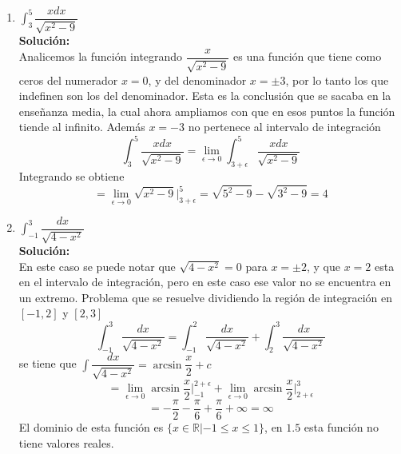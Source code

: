 \documentclass[10pt,twoside]{SelfArx} %
\begin{document}
\begin{enumerate}
\item $ \int_{3}^{5}\dfrac{xdx}{\sqrt{x^{2}-9}} $\\
\textbf{Solución:}\\
Analicemos la función integrando
$  \dfrac{x}{\sqrt{x^{2}-9}}  $ es una función que tiene como ceros del numerador $ x=0 $, y del denominador $ x=\pm3 $, por lo tanto los que indefinen son los del denominador. Esta es la conclusión que se sacaba en la enseñanza media, la cual ahora ampliamos con que en esos puntos la función tiende al infinito. Además $ x=-3 $ no pertenece al intervalo de integraci\'on
\begin{equation}
\int_{3}^{5}\dfrac{xdx}{\sqrt{x^{2}-9}}=\lim\limits_{\epsilon\rightarrow0}\int_{3+\epsilon}^{5}\dfrac{xdx}{\sqrt{x^{2}-9}}
\end{equation}
Integrando se obtiene
\begin{equation}
=\lim\limits_{\epsilon\rightarrow0}\sqrt{x^{2}-9}\bigg|_{3+\epsilon}^{5}=\sqrt{5^{2}-9}-\sqrt{3^{2}-9}=4
\end{equation}

\item $ \int_{-1}^{3}\dfrac{dx}{\sqrt{4-x^{2}}} $\\
\textbf{Solución:}\\
En este caso se puede notar que $ \sqrt{4-x^{2}}=0 $ para $ x=\pm2 $, y que $ x=2 $ esta en el intervalo de integraci\'on, pero en este caso ese valor no se encuentra en un extremo. Problema que se resuelve dividiendo la región de integración en $ [-1,2] $ y $ [2,3] $
\begin{equation}
\int_{-1}^{3}\dfrac{dx}{\sqrt{4-x^{2}}}=\int_{-1}^{2}\dfrac{dx}{\sqrt{4-x^{2}}}+\int_{2}^{3}\dfrac{dx}{\sqrt{4-x^{2}}}
\end{equation}
se tiene que $ \displaystyle\int\dfrac{dx}{\sqrt{4-x^{2}}}=\arcsin\dfrac{x}{2}+c $
\begin{equation}
=\lim\limits_{\epsilon\rightarrow0}\arcsin\dfrac{x}{2}\bigg|_{-1}^{2+\epsilon}+\lim\limits_{\epsilon\rightarrow0}\arcsin\dfrac{x}{2}\bigg|_{2+\epsilon}^{3}
\end{equation}
\begin{equation}
=-\dfrac{\pi}{2}-\dfrac{\pi}{6}+\dfrac{\pi}{6}+\infty=\infty
\end{equation}
El dominio de esta funci\'on es $ \{x\in \mathbb{R}|-1\leq x\leq 1\} $, en $ 1.5 $ esta función no tiene valores reales.
\end{enumerate}
\end{document}
